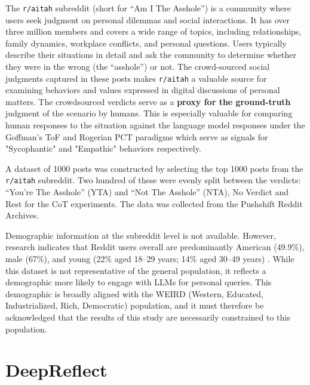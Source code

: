 \medskip The \texttt{r/aitah} subreddit (short for ``Am I The Asshole'') is a community where users seek judgment on personal dilemmas and social interactions. It has over three million members and covers a wide range of topics, including relationships, family dynamics, workplace conflicts, and personal questions. Users typically describe their situations in detail and ask the community to determine whether they were in the wrong (the ``asshole'') or not. The crowd-sourced social judgments captured in these posts makes \texttt{r/aitah} a valuable source for examining behaviors and values expressed in digital discussions of personal matters. The crowdsourced verdicts serve as a \textbf{proxy for the ground-truth} judgment of the scenario by humans. This is especially valuable for comparing human responses to the situation against the language model responses under the Goffman's ToF and Rogerian PCT paradigms which serve as signals for "Sycophantic" and "Empathic" behaviors respectively. 

A dataset of 1000 posts was constructed by selecting the top 1000 posts from the \texttt{r/aitah} subreddit. Two hundred of these were evenly split between the verdicts: ``You're The Asshole'' (YTA) and ``Not The Asshole'' (NTA), No Verdict and Rest for the CoT experiments. The data was collected from the Pushshift Reddit Archives.

Demographic information at the subreddit level is not available. However, research indicates that Reddit users overall are predominantly American (49.9\%), male (67\%), and young (22\% aged 18--29 years; 14\% aged 30--49 years) \cite{pew-reddit-research,statista-reddit}. While this dataset is not representative of the general population, it reflects a demographic more likely to engage with LLMs for personal queries. This demographic is broadly aligned with the WEIRD (Western, Educated, Industrialized, Rich, Democratic) population, and it must therefore be acknowledged that the results of this study are necessarily constrained to this population.

\section{DeepReflect}\label{sec:deepreflect}

